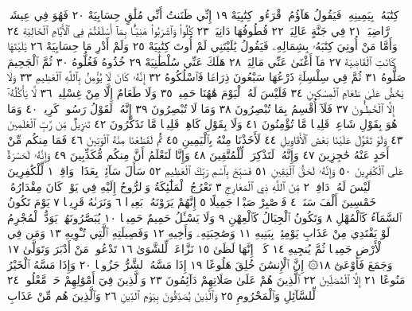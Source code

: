 كِتَٰبَهُۥ بِيَمِينِهِۦ فَيَقُولُ هَآؤُمُ ٱقْرَءُوا۟ كِتَٰبِيَهْ ١٩ إِنِّي ظَنَنتُ أَنِّي مُلَٰقٍ
حِسَابِيَهْ ٢٠ فَهُوَ فِي عِيشَةࣲ رَّاضِيَةࣲ ٢١ فِي جَنَّةٍ عَالِيَةࣲ ٢٢ قُطُوفُهَا
دَانِيَةࣱ ٢٣ كُلُوا۟ وَٱشْرَبُوا۟ هَنِيٓـَٔۢا بِمَآ أَسْلَفْتُمْ فِي ٱلْأَيَّامِ ٱلْخَالِيَةِ ٢٤
وَأَمَّا مَنْ أُوتِيَ كِتَٰبَهُۥ بِشِمَالِهِۦ فَيَقُولُ يَٰلَيْتَنِي لَمْ أُوتَ كِتَٰبِيَهْ ٢٥ وَلَمْ أَدْرِ
مَا حِسَابِيَهْ ٢٦ يَٰلَيْتَهَا كَانَتِ ٱلْقَاضِيَةَ ٢٧ مَآ أَغْنَىٰ عَنِّي مَالِيَهْ͏ۜ ٢٨ هَلَكَ
عَنِّي سُلْطَٰنِيَهْ ٢٩ خُذُوهُ فَغُلُّوهُ ٣٠ ثُمَّ ٱلْجَحِيمَ صَلُّوهُ ٣١ ثُمَّ فِي سِلْسِلَةࣲ
ذَرْعُهَا سَبْعُونَ ذِرَاعࣰا فَٱسْلُكُوهُ ٣٢ إِنَّهُۥ كَانَ لَا يُؤْمِنُ بِٱللَّهِ ٱلْعَظِيمِ ٣٣
وَلَا يَحُضُّ عَلَىٰ طَعَامِ ٱلْمِسْكِينِ ٣٤ فَلَيْسَ لَهُ ٱلْيَوْمَ هَٰهُنَا حَمِيمࣱ ٣٥
وَلَا طَعَامٌ إِلَّا مِنْ غِسْلِينࣲ ٣٦ لَّا يَأْكُلُهُۥٓ إِلَّا ٱلْخَٰطِـُٔونَ ٣٧ فَلَآ أُقْسِمُ بِمَا
تُبْصِرُونَ ٣٨ وَمَا لَا تُبْصِرُونَ ٣٩ إِنَّهُۥ لَقَوْلُ رَسُولࣲ كَرِيمࣲ ٤٠ وَمَا هُوَ بِقَوْلِ
شَاعِرࣲۚ قَلِيلࣰا مَّا تُؤْمِنُونَ ٤١ وَلَا بِقَوْلِ كَاهِنࣲۚ قَلِيلࣰا مَّا تَذَكَّرُونَ ٤٢
تَنزِيلࣱ مِّن رَّبِّ ٱلْعَٰلَمِينَ ٤٣ وَلَوْ تَقَوَّلَ عَلَيْنَا بَعْضَ ٱلْأَقَاوِيلِ ٤٤
لَأَخَذْنَا مِنْهُ بِٱلْيَمِينِ ٤٥ ثُمَّ لَقَطَعْنَا مِنْهُ ٱلْوَتِينَ ٤٦ فَمَا مِنكُم
مِّنْ أَحَدٍ عَنْهُ حَٰجِزِينَ ٤٧ وَإِنَّهُۥ لَتَذْكِرَةࣱ لِّلْمُتَّقِينَ ٤٨ وَإِنَّا
لَنَعْلَمُ أَنَّ مِنكُم مُّكَذِّبِينَ ٤٩ وَإِنَّهُۥ لَحَسْرَةٌ عَلَى ٱلْكَٰفِرِينَ ٥٠
وَإِنَّهُۥ لَحَقُّ ٱلْيَقِينِ ٥١ فَسَبِّحْ بِٱسْمِ رَبِّكَ ٱلْعَظِيمِ ٥٢
سَأَلَ سَآئِلُۢ بِعَذَابࣲ وَاقِعࣲ ١ لِّلْكَٰفِرِينَ لَيْسَ لَهُۥ دَافِعࣱ ٢
مِّنَ ٱللَّهِ ذِي ٱلْمَعَارِجِ ٣ تَعْرُجُ ٱلْمَلَٰٓئِكَةُ وَٱلرُّوحُ إِلَيْهِ فِي
يَوْمࣲ كَانَ مِقْدَارُهُۥ خَمْسِينَ أَلْفَ سَنَةࣲ ٤ فَٱصْبِرْ صَبْرࣰا جَمِيلًا ٥
إِنَّهُمْ يَرَوْنَهُۥ بَعِيدࣰا ٦ وَنَرَىٰهُ قَرِيبࣰا ٧ يَوْمَ تَكُونُ ٱلسَّمَآءُ
كَٱلْمُهْلِ ٨ وَتَكُونُ ٱلْجِبَالُ كَٱلْعِهْنِ ٩ وَلَا يَسْـَٔلُ حَمِيمٌ حَمِيمࣰا ١٠
يُبَصَّرُونَهُمْۚ يَوَدُّ ٱلْمُجْرِمُ لَوْ يَفْتَدِي مِنْ عَذَابِ يَوْمِئِذِۭ بِبَنِيهِ ١١
وَصَٰحِبَتِهِۦ وَأَخِيهِ ١٢ وَفَصِيلَتِهِ ٱلَّتِي تُـْٔوِيهِ ١٣ وَمَن فِي ٱلْأَرْضِ جَمِيعࣰا
ثُمَّ يُنجِيهِ ١٤ كَلَّآۖ إِنَّهَا لَظَىٰ ١٥ نَزَّاعَةࣰ لِّلشَّوَىٰ ١٦ تَدْعُوا۟ مَنْ أَدْبَرَ
وَتَوَلَّىٰ ١٧ وَجَمَعَ فَأَوْعَىٰٓ ١٨۞ إِنَّ ٱلْإِنسَٰنَ خُلِقَ هَلُوعًا ١٩ إِذَا مَسَّهُ ٱلشَّرُّ
جَزُوعࣰا ٢٠ وَإِذَا مَسَّهُ ٱلْخَيْرُ مَنُوعًا ٢١ إِلَّا ٱلْمُصَلِّينَ ٢٢ ٱلَّذِينَ هُمْ
عَلَىٰ صَلَاتِهِمْ دَآئِمُونَ ٢٣ وَٱلَّذِينَ فِيٓ أَمْوَٰلِهِمْ حَقࣱّ مَّعْلُومࣱ ٢٤ لِّلسَّآئِلِ
وَٱلْمَحْرُومِ ٢٥ وَٱلَّذِينَ يُصَدِّقُونَ بِيَوْمِ ٱلدِّينِ ٢٦ وَٱلَّذِينَ هُم مِّنْ عَذَابِ
